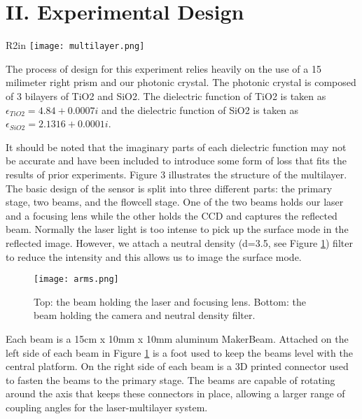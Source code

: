 \section*{\textbf{II. Experimental Design}}

\begin{wrapfigure}{R}{2in}
    \texttt{[image: multilayer.png]}
    \caption{An illustration of the photonic crystal used in our sensor}
    \label{fig:multilayer}
\end{wrapfigure}
\hspace{0.15in}
The process of design for this experiment relies heavily on the use of a 15 milimeter right prism and our photonic crystal. The photonic crystal is composed of 3 bilayers of TiO2 and SiO2. The dielectric function of TiO2 is taken as $\epsilon_{TiO2} = 4.84 + 0.0007i$ and the dielectric function of SiO2 is taken as $\epsilon_{SiO2} = 2.1316 + 0.0001i$. 


It should be noted that the imaginary parts of each dielectric function may not be accurate and have been included to introduce some form of loss that fits the results of prior experiments. Figure 3 illustrates the structure of the multilayer.
The basic design of the sensor is split into three different parts: the primary stage, two beams, and the flowcell stage.  One of the two beams holds our laser and a focusing lens while the other holds the CCD and captures the reflected beam. Normally the laser light is too intense to pick up the surface mode in the reflected image. However, we attach a neutral density (d=3.5, see Figure \ref{fig:beams}) filter to reduce the intensity and this allows us to image the surface mode. 

\begin{figure}[h]
    \begin{center}
    \texttt{[image: arms.png]}
    \caption{Top: the beam holding the laser and focusing lens. Bottom: the beam holding the camera and neutral density filter.}
    \label{fig:beams}
    \end{center}
\end{figure}

Each beam is a 15cm x 10mm x 10mm aluminum MakerBeam. Attached on the left side of each beam in Figure \ref{fig:beams} is a foot used to keep the beams level with the central platform. On the right side of each beam is a 3D printed connector used to fasten the beams to the primary stage. The beams are capable of rotating around the axis that keeps these connectors in place, allowing a larger range of coupling angles for the laser-multilayer system.


